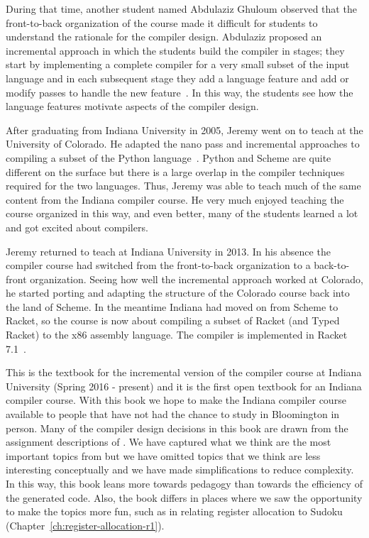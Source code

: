 \documentclass[11pt]{book}
\begin{document}
During that time, another student named Abdulaziz Ghuloum observed
that the front-to-back organization of the course made it difficult
for students to understand the rationale for the compiler
design. Abdulaziz proposed an incremental approach in which the
students build the compiler in stages; they start by implementing a
complete compiler for a very small subset of the input language and in
each subsequent stage they add a language feature and add or modify
passes to handle the new feature~\citep{Ghuloum:2006bh}.  In this way,
the students see how the language features motivate aspects of the
compiler design.

After graduating from Indiana University in 2005, Jeremy went on to
teach at the University of Colorado. He adapted the nano pass and
incremental approaches to compiling a subset of the Python
language~\citep{Siek:2012ab}.  Python and Scheme are quite different
on the surface but there is a large overlap in the compiler techniques
required for the two languages. Thus, Jeremy was able to teach much of
the same content from the Indiana compiler course. He very much
enjoyed teaching the course organized in this way, and even better,
many of the students learned a lot and got excited about compilers.

Jeremy returned to teach at Indiana University in 2013.  In his
absence the compiler course had switched from the front-to-back
organization to a back-to-front organization. Seeing how well the
incremental approach worked at Colorado, he started porting and
adapting the structure of the Colorado course back into the land of
Scheme. In the meantime Indiana had moved on from Scheme to Racket, so
the course is now about compiling a subset of Racket (and Typed
Racket) to the x86 assembly language. The compiler is implemented in
Racket 7.1~\citep{plt-tr}.

This is the textbook for the incremental version of the compiler
course at Indiana University (Spring 2016 - present) and it is the
first open textbook for an Indiana compiler course.  With this book we
hope to make the Indiana compiler course available to people that have
not had the chance to study in Bloomington in person.  Many of the
compiler design decisions in this book are drawn from the assignment
descriptions of \cite{Dybvig:2010aa}. We have captured what we think
are the most important topics from \cite{Dybvig:2010aa} but we have
omitted topics that we think are less interesting conceptually and we
have made simplifications to reduce complexity.  In this way, this
book leans more towards pedagogy than towards the efficiency of the
generated code. Also, the book differs in places where we saw the
opportunity to make the topics more fun, such as in relating register
allocation to Sudoku (Chapter~\ref{ch:register-allocation-r1}).
\end{document}

